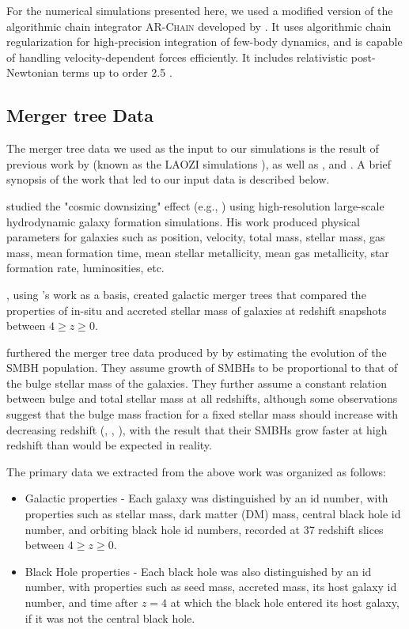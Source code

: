 \documentclass[fleqn,usenatbib,useAMS]{mnras}
\begin{document}
For the numerical simulations presented here, we used a modified version of the algorithmic chain integrator \textsc{AR-Chain} developed by \citet{2006MNRAS.372..219M}. It uses algorithmic chain regularization for high-precision integration of few-body dynamics, and is capable of handling velocity-dependent forces efficiently. It includes relativistic post-Newtonian terms up to order 2.5 \citep{2008AJ....135.2398M}.


\subsection{Merger tree Data}
The merger tree data we used as the input to our simulations is the result of previous work by \citet{2011ApJ...741...99C, 2011ApJ...742L..33C, 2012ApJ...753...17C, 2012ApJ...748..121C, 2013ApJ...770..139C}  (known as the LAOZI simulations \citealt{2014ApJ...781...38C}), as well as  \citet{2012MNRAS.425..641L}, and \citet{2015ApJ...799..178K}.  A brief synopsis of the work that led to our input data is described below.

\citet{2011ApJ...741...99C} studied the "cosmic downsizing" effect (e.g., \citealt{1996AJ....112..839C}) using high-resolution large-scale hydrodynamic galaxy formation simulations.  His work produced physical parameters for galaxies such as position, velocity, total mass, stellar mass, gas mass, mean formation time, mean stellar metallicity, mean gas metallicity, star formation rate, luminosities, etc.

\citet{2012MNRAS.425..641L}, using \citet{2011ApJ...741...99C}'s work as a basis, created galactic merger trees that compared the properties of in-situ and accreted stellar mass of galaxies at redshift snapshots between $4\geq z \geq0$.

\citet{2015ApJ...799..178K} furthered the merger tree data produced by \citet{2012MNRAS.425..641L} by estimating the evolution of the SMBH population.  They assume growth of SMBHs to be proportional to that of the bulge stellar mass of the galaxies.  They further assume a constant relation between bulge and total stellar mass at all redshifts, although some observations suggest that the bulge mass fraction for a fixed stellar mass should increase with decreasing redshift (\citet{2012MNRAS.423.1992S}, \citet{2013MNRAS.428.1351G}, \citet{2014MNRAS.441..417A}), with the result that their SMBHs grow faster at high redshift than would be expected in reality.

The primary data we extracted from the above work was organized as follows:
\begin{itemize}
    \item Galactic properties - Each galaxy was distinguished by an id number, with properties such as stellar mass, dark matter (DM) mass, central black hole id number, and orbiting black hole id numbers, recorded at 37 redshift slices between $4\geq z \geq0$.
    \item Black Hole properties - Each black hole was also distinguished by an id number, with properties such as seed mass, accreted mass, its host galaxy id number, and time after $z=4$ at which the black hole entered its host galaxy, if it was not the central black hole.
\end{itemize}
\end{document}
